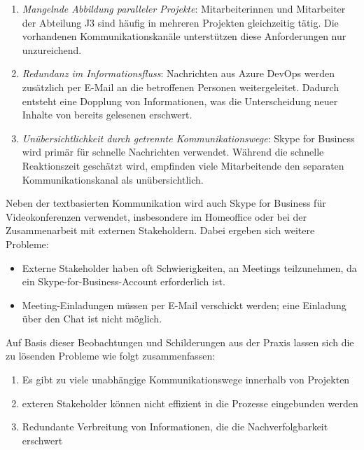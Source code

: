\documentclass[ThesisDJ.tex]{subfiles}
\begin{document}
  \begin{enumerate}
    \item \emph{Mangelnde Abbildung paralleler Projekte}: Mitarbeiterinnen und Mitarbeiter der Abteilung J3 sind häufig in mehreren Projekten gleichzeitig tätig. Die vorhandenen Kommunikationskanäle unterstützen diese Anforderungen nur unzureichend.
    \item \emph{Redundanz im Informationsfluss}: Nachrichten aus Azure DevOps werden zusätzlich per E-Mail an die betroffenen Personen weitergeleitet. Dadurch entsteht eine Dopplung von Informationen, was die Unterscheidung neuer Inhalte von bereits gelesenen erschwert.
    \item \emph{Unübersichtlichkeit durch getrennte Kommunikationswege}: Skype for Business wird primär für schnelle Nachrichten verwendet. Während die schnelle Reaktionszeit geschätzt wird, empfinden viele Mitarbeitende den separaten Kommunikationskanal als unübersichtlich.
  \end{enumerate}

  Neben der textbasierten Kommunikation wird auch Skype for Business für Videokonferenzen verwendet, insbesondere im Homeoffice oder bei 
  der Zusammenarbeit mit externen Stakeholdern. Dabei ergeben sich weitere Probleme:

  \begin{itemize}
    \item Externe Stakeholder haben oft Schwierigkeiten, an Meetings teilzunehmen, da ein Skype-for-Business-Account erforderlich ist.
    \item Meeting-Einladungen müssen per E-Mail verschickt werden; eine Einladung über den Chat ist nicht möglich.
  \end{itemize}

  Auf Basis dieser Beobachtungen und Schilderungen aus der Praxis lassen sich die zu lösenden Probleme wie folgt zusammenfassen:

  \begin{enumerate}
    \item Es gibt zu viele unabhängige Kommunikationswege innerhalb von Projekten
    \item exteren Stakeholder können nicht effizient in die Prozesse eingebunden werden 
    \item Redundante Verbreitung von Informationen, die die Nachverfolgbarkeit erschwert
  \end{enumerate}
\end{document}
